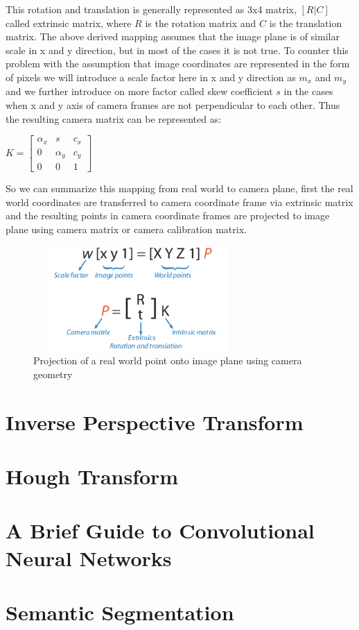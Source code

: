     This rotation and translation is generally represented as 3x4 matrix, $[R | C ]$ called extrinsic matrix, where $R$ is the rotation matrix and $C$ is the translation matrix. The above derived mapping assumes that the image plane is of similar scale in x and y direction, but in most of the cases it is not true. To counter this problem with the assumption that image coordinates are represented in the form of pixels we will introduce a scale factor here in x and y direction as $m_{x}$ and $m_{y}$ and we further introduce on more factor called skew coefficient $s$ in the cases when x and y axis of camera frames are not perpendicular to each other. Thus the resulting camera matrix can be represented as:
        \begin{center}
$K =  \begin{bmatrix} \alpha_{x} & s &c_{x} \\  0 & \alpha_{y} & c_{y}  \\  0  &0 &1 \end{bmatrix}$
    \end{center}
    
    So we can summarize this mapping from real world to camera plane, first the real world coordinates are transferred to camera coordinate frame via extrinsic matrix and the resulting points in camera coordinate frames are projected to image plane using camera matrix or camera calibration matrix. 
        \begin{figure}[h]
    \centering
    \includegraphics[width=8cm, height =4cm]{images/extrinsic_intrinsic.png}
    \caption{ Projection of a real world point onto image plane using camera geometry \cite{10.5555/861369}}
    \end{figure}
    
   
   
    \section{Inverse Perspective Transform}
    
    \section{Hough Transform}
    
    \section{A Brief Guide to Convolutional Neural Networks}
    
    \section{Semantic Segmentation}
    

